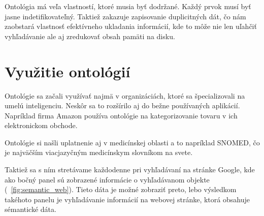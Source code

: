 \documentclass[12pt, a4paper, oneside]{book}
\begin{document}
Ontológia má veľa vlastností, ktoré musia byť dodržané. Každý prvok musí byť jasne indetifikovateľný. Taktiež zakazuje zapisovanie duplicitných dát, čo nám zaobstará vlastnosť efektívneho ukladania informácií, kde to môže nie len uľahčiť vyhľadávanie ale aj zredukovať obsah pamäti na disku. 


\section{Využitie ontológií}

Ontológie sa začali využívať najmä v organizáciách, ktoré sa špecializovali na umelú inteligenciu. Neskôr sa to rozšírilo aj do bežne používaných aplikácií. Napríklad firma Amazon používa ontológie na kategorizovanie tovaru v ich elektronickom obchode.



Ontológie si našli uplatnenie aj v medicínskej oblasti a to napríklad SNOMED, čo je najväčším viacjazyčným medicínskym slovníkom na svete. 


Taktiež sa s ním stretávame každodenne pri vyhľadávaní na stránke Google, kde ako bočný panel sú zobrazené informácie o vyhľadávanom objekte (~\ref{fig:semantic_web}). Tieto dáta je možné zobraziť preto, lebo výsledkom takéhoto panelu je vyhľadávanie informácií na webovej stránke, ktorá obsahuje sémantické dáta.
\end{document}
